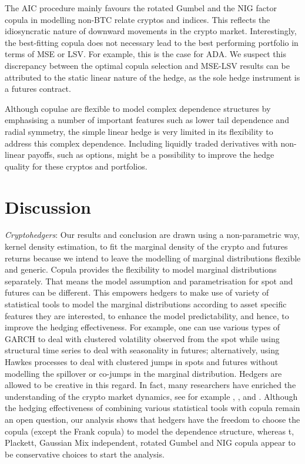 The AIC procedure mainly favours the rotated Gumbel and the NIG
factor copula in modelling non-BTC relate cryptos and indices. This
reflects the idiosyncratic nature of 
downward movements in the crypto market. Interestingly, the best-fitting
copula does not necessary lead to the best performing portfolio in
terms of MSE or LSV. For example, this is the case for ADA.
We suspect this discrepancy between the optimal copula selection and
MSE-LSV results can be attributed to the static linear nature of the
hedge, as the sole hedge instrument is a futures contract. 

Although copulae are flexible to model complex dependence structures
by emphasising a number of important features such as lower tail
dependence and radial symmetry, the simple linear hedge is very
limited in its flexibility to address this complex dependence.
Including liquidly traded derivatives with non-linear payoffs, such as
options, might be a possibility to improve the hedge quality for these
cryptos and portfolios.

\section{Discussion}\label{sec:discussion}
\textit{Cryptohedgers}: Our results and conclusion are drawn using a non-parametric way, kernel density estimation,
to fit the marginal density of the crypto and futures returns because we intend to leave the modelling of marginal distributions flexible and generic.
Copula provides the flexibility to model marginal distributions separately.
That means the model assumption and parametrisation for spot and futures can be different.
This empowers hedgers to make use of variety of statistical tools to model the marginal distributions according to asset specific features they are interested,
to enhance the model predictability, and hence, to improve the hedging effectiveness.
For example, one can use various types of GARCH to deal with clustered volatility observed from the spot while using structural time series to deal with seasonality in futures;
alternatively, using Hawkes processes to deal with clustered jumps in spots and futures without modelling the spillover or co-jumps in the marginal distribution.
Hedgers are allowed to be creative in this regard. In fact, many researchers have enriched the understanding of the crypto market dynamics,
see for example \citet{kaiser2019seasonality}, \citet{gyamerah2022modelling}, and \citet{mark2022quantifying}.
Although the hedging effectiveness of combining various statistical tools with copula remain an open question,
our analysis shows that hedgers have the freedom to choose the copula (except the Frank copula) to model the dependence structure,
whereas t, Plackett, Gaussian Mix independent, rotated Gumbel and NIG copula appear to be conservative choices to start the analysis.

